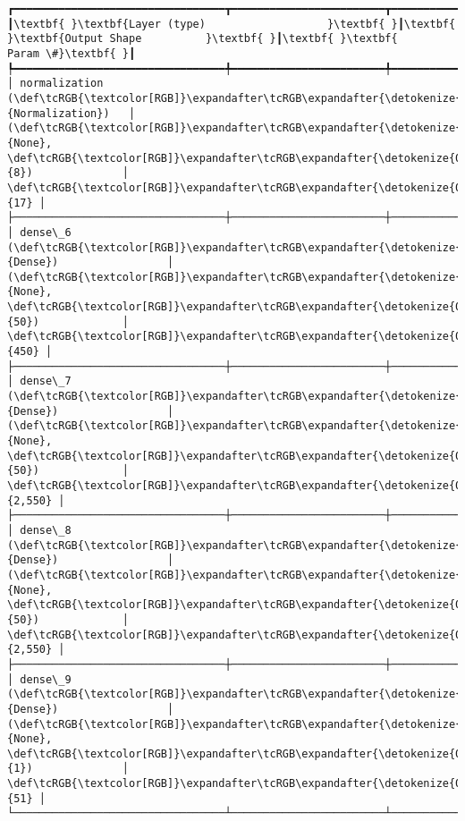 \documentclass[12pt letter]{report}
\begin{document}
    \begin{Verbatim}[commandchars=\\\{\}]
┏━━━━━━━━━━━━━━━━━━━━━━━━━━━━━━━━━┳━━━━━━━━━━━━━━━━━━━━━━━━┳━━━━━━━━━━━━━━━┓
┃\textbf{ }\textbf{Layer (type)                   }\textbf{ }┃\textbf{ }\textbf{Output Shape          }\textbf{ }┃\textbf{ }\textbf{      Param \#}\textbf{ }┃
┡━━━━━━━━━━━━━━━━━━━━━━━━━━━━━━━━━╇━━━━━━━━━━━━━━━━━━━━━━━━╇━━━━━━━━━━━━━━━┩
│ normalization (\def\tcRGB{\textcolor[RGB]}\expandafter\tcRGB\expandafter{\detokenize{0,135,255}}{Normalization})   │ (\def\tcRGB{\textcolor[RGB]}\expandafter\tcRGB\expandafter{\detokenize{0,215,255}}{None}, \def\tcRGB{\textcolor[RGB]}\expandafter\tcRGB\expandafter{\detokenize{0,175,0}}{8})              │            \def\tcRGB{\textcolor[RGB]}\expandafter\tcRGB\expandafter{\detokenize{0,175,0}}{17} │
├─────────────────────────────────┼────────────────────────┼───────────────┤
│ dense\_6 (\def\tcRGB{\textcolor[RGB]}\expandafter\tcRGB\expandafter{\detokenize{0,135,255}}{Dense})                 │ (\def\tcRGB{\textcolor[RGB]}\expandafter\tcRGB\expandafter{\detokenize{0,215,255}}{None}, \def\tcRGB{\textcolor[RGB]}\expandafter\tcRGB\expandafter{\detokenize{0,175,0}}{50})             │           \def\tcRGB{\textcolor[RGB]}\expandafter\tcRGB\expandafter{\detokenize{0,175,0}}{450} │
├─────────────────────────────────┼────────────────────────┼───────────────┤
│ dense\_7 (\def\tcRGB{\textcolor[RGB]}\expandafter\tcRGB\expandafter{\detokenize{0,135,255}}{Dense})                 │ (\def\tcRGB{\textcolor[RGB]}\expandafter\tcRGB\expandafter{\detokenize{0,215,255}}{None}, \def\tcRGB{\textcolor[RGB]}\expandafter\tcRGB\expandafter{\detokenize{0,175,0}}{50})             │         \def\tcRGB{\textcolor[RGB]}\expandafter\tcRGB\expandafter{\detokenize{0,175,0}}{2,550} │
├─────────────────────────────────┼────────────────────────┼───────────────┤
│ dense\_8 (\def\tcRGB{\textcolor[RGB]}\expandafter\tcRGB\expandafter{\detokenize{0,135,255}}{Dense})                 │ (\def\tcRGB{\textcolor[RGB]}\expandafter\tcRGB\expandafter{\detokenize{0,215,255}}{None}, \def\tcRGB{\textcolor[RGB]}\expandafter\tcRGB\expandafter{\detokenize{0,175,0}}{50})             │         \def\tcRGB{\textcolor[RGB]}\expandafter\tcRGB\expandafter{\detokenize{0,175,0}}{2,550} │
├─────────────────────────────────┼────────────────────────┼───────────────┤
│ dense\_9 (\def\tcRGB{\textcolor[RGB]}\expandafter\tcRGB\expandafter{\detokenize{0,135,255}}{Dense})                 │ (\def\tcRGB{\textcolor[RGB]}\expandafter\tcRGB\expandafter{\detokenize{0,215,255}}{None}, \def\tcRGB{\textcolor[RGB]}\expandafter\tcRGB\expandafter{\detokenize{0,175,0}}{1})              │            \def\tcRGB{\textcolor[RGB]}\expandafter\tcRGB\expandafter{\detokenize{0,175,0}}{51} │
└─────────────────────────────────┴────────────────────────┴───────────────┘

    \end{Verbatim}
\end{document}
